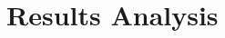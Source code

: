 \documentclass{article}
\providecommand{\rowcolor}[1]{}
\theoremstyle{plain}
\theoremstyle{definition}
\theoremstyle{remark}
\begin{document}
\section{Results Analysis}
\end{document}
